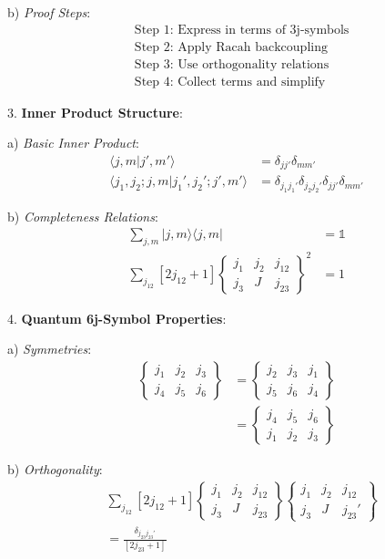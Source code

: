 \documentclass[12pt,a4paper]{article}
\begin{document}
   b) \textit{Proof Steps}:
      \[
      \begin{aligned}
      &\text{Step 1: Express in terms of 3j-symbols} \\
      &\text{Step 2: Apply Racah backcoupling} \\
      &\text{Step 3: Use orthogonality relations} \\
      &\text{Step 4: Collect terms and simplify}
      \end{aligned}
      \]

3. \textbf{Inner Product Structure}:
   
   a) \textit{Basic Inner Product}:
      \[
      \begin{aligned}
      \langle j,m|j',m'\rangle &= \delta_{jj'}\delta_{mm'} \\
      \langle j_1,j_2;j,m|j_1',j_2';j',m'\rangle &= \delta_{j_1j_1'}\delta_{j_2j_2'}\delta_{jj'}\delta_{mm'}
      \end{aligned}
      \]
   
   b) \textit{Completeness Relations}:
      \[
      \begin{aligned}
      \sum_{j,m} |j,m\rangle\langle j,m| &= \mathbb{1} \\
      \sum_{j_{12}} [2j_{12}+1] 
      \begin{Bmatrix}
      j_1 & j_2 & j_{12} \\
      j_3 & J & j_{23}
      \end{Bmatrix}^2 &= 1
      \end{aligned}
      \]

4. \textbf{Quantum 6j-Symbol Properties}:
   
   a) \textit{Symmetries}:
      \[
      \begin{aligned}
      \begin{Bmatrix}
      j_1 & j_2 & j_3 \\
      j_4 & j_5 & j_6
      \end{Bmatrix} &= 
      \begin{Bmatrix}
      j_2 & j_3 & j_1 \\
      j_5 & j_6 & j_4
      \end{Bmatrix} \\
      &= \begin{Bmatrix}
      j_4 & j_5 & j_6 \\
      j_1 & j_2 & j_3
      \end{Bmatrix}
      \end{aligned}
      \]
   
   b) \textit{Orthogonality}:
      \[
      \begin{aligned}
      &\sum_{j_{12}} [2j_{12}+1]
      \begin{Bmatrix}
      j_1 & j_2 & j_{12} \\
      j_3 & J & j_{23}
      \end{Bmatrix}
      \begin{Bmatrix}
      j_1 & j_2 & j_{12} \\
      j_3 & J & j_{23}'
      \end{Bmatrix} \\
      &= \frac{\delta_{j_{23}j_{23}'}}{[2j_{23}+1]}
      \end{aligned}
      \]
\end{document}
